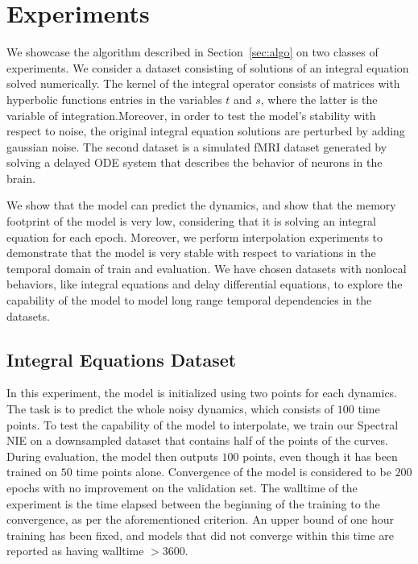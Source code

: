 \documentclass[11pt,fleqn]{amsart} %
\begin{document}
	
	\section{Experiments}\label{sec:experiments} 
	
	We showcase the algorithm described in Section~\ref{sec:algo} on two classes of experiments. We consider a dataset consisting of solutions of an integral equation solved numerically. The kernel of the integral operator consists of matrices with hyperbolic functions entries in the variables $t$ and $s$, where the latter is the variable of integration.Moreover, in order to test the model's stability with respect to noise, the original integral equation solutions are perturbed by adding gaussian noise.
	The second dataset is a simulated fMRI dataset generated by solving a delayed ODE system that describes the behavior of neurons in the brain. 
	
	We show that the model can predict the dynamics, and show that the memory footprint of the model is very low, considering that it is solving an integral equation for each epoch. Moreover, we perform interpolation experiments to demonstrate that the model is very stable with respect to variations in the temporal domain of train and evaluation. We have chosen datasets with nonlocal behaviors, like integral equations and delay differential equations, to explore the capability of the model to model long range temporal dependencies in the datasets.
	
	
	
	\subsection{Integral Equations Dataset}
	
	In this experiment, the model is initialized using two points for each dynamics. The task is to predict the whole noisy dynamics, which consists of $100$ time points. To test the capability of the model to interpolate, we train our Spectral NIE on a downsampled dataset that contains half of the points of the curves. During evaluation, the model then outputs $100$ points, even though it has been trained on $50$ time points alone. Convergence of the model is considered to be $200$ epochs with no improvement on the validation set. The walltime of the experiment is the time elapsed between the beginning of the training to the convergence, as per the aforementioned criterion. An upper bound of one hour training has been fixed, and models that did not converge within this time are reported as having walltime $> 3600$. 
	
\end{document}
